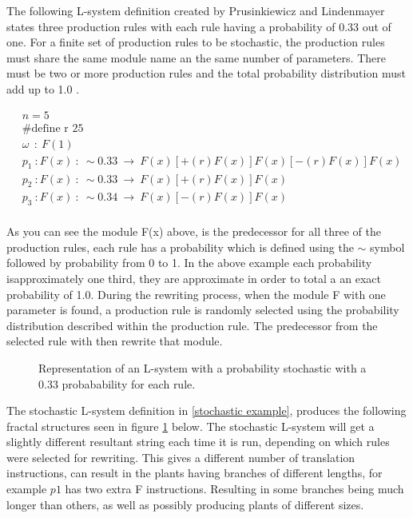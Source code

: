 The following L-system definition created by Prusinkiewicz and Lindenmayer states three production rules with each rule having a probability of 0.33 out of one. For a finite set of production rules to be stochastic, the production rules must share the same module name an the same number of parameters. There must be two or more production rules and the total probability distribution must add up to 1.0 \cite{prusinkiewicz2012algorithmic}.

\begin{equation} \label{stochastic example}
\begin{aligned}
	&n=5\\
	&\text{\#define r 25}\\
	&\omega~~ :~ F(1)\\
	&p_1~ :  F(x)~ :~ \sim 0.33 ~ \rightarrow~ F(x)[+(r)F(x)]F(x)[-(r)F(x)]F(x)\\
	&p_2~ :  F(x)~ :~ \sim 0.33 ~ \rightarrow~ F(x)[+(r)F(x)]F(x)\\
	&p_3~ :  F(x)~ :~ \sim 0.34 ~ \rightarrow~ F(x)[-(r)F(x)]F(x)\\
\end{aligned}
\end{equation}

\noindent
As you can see the module F(x) above, is the predecessor for all three of the production rules, each rule has a probability which is defined using the $\sim$ symbol followed by probability from 0 to  1. In the above example each probability isapproximately one third, they are approximate in order to total a an exact probability of 1.0. During the rewriting process, when the module F with one parameter is found, a production rule is randomly selected using the probability distribution described within the production rule. The predecessor from the selected rule with then rewrite that module. 

\begin{figure}[htbp]
	{\centering
		\vspace{7px}
		\setlength{\fboxrule}{1pt}
		\caption{Representation of an L-system with a probability stochastic with a 0.33 probabability for each rule.} \label{stochastic diagram}
	}
\end{figure}
\FloatBarrier

\noindent
The stochastic L-system definition in \ref{stochastic example}, produces the following fractal structures seen in figure \ref{stochastic diagram} below. The stochastic L-system will get a slightly different resultant string each time it is run, depending on which rules were selected for rewriting. This gives a different number of translation instructions, can result in the plants having branches of different lengths, for example $p1$ has two extra F instructions. Resulting in some branches being much longer than others, as well as possibly producing plants of different sizes. 

